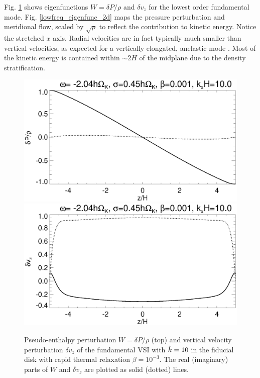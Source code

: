 Fig. \ref{lowfreq_eigenfunc} shows 
eigenfunctions $W = \delta P/\rho$ and $\delta   v_z$ for the lowest order fundamental mode.  
Fig. \ref{lowfreq_eigenfunc_2d} maps the pressure perturbation and meridional flow,
scaled by $\sqrt{\rho}$ to reflect the contribution to kinetic
energy. Notice the stretched $x$ axis. Radial velocities are in fact typically much 
smaller than vertical velocities, as expected for a vertically
elongated, anelastic mode . Most of the kinetic
energy is contained within $\sim 2H$ of the midplane due to the
density stratification.  



\begin{figure}
  \includegraphics[width=\linewidth,clip=true,trim=0cm 1.75cm 0cm
  0cm]{figures/eigenvectorW_iso} 
  \includegraphics[width=\linewidth,clip=true,trim=0cm 0cm 0cm
  1cm]{figures/eigenvectorvz_iso}
  \caption{Pseudo-enthalpy perturbation $W=\delta P/\rho$ (top) and
    vertical velocity perturbation $\delta v_z$ of the fundamental VSI with 
    $\hat{k}=10$ in the fiducial disk with rapid thermal relaxation
    $\beta=10^{-3}$. The real (imaginary) parts of $W$ and $\delta
    v_z$ are plotted as solid (dotted) lines.  
    \label{lowfreq_eigenfunc}}
\end{figure}

